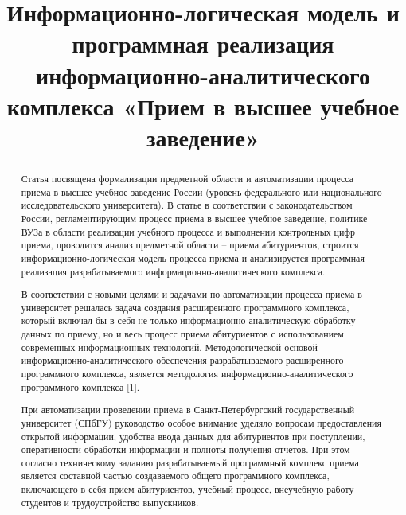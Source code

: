 \documentclass[]{article}
\title{Информационно-логическая модель и программная реализация  информационно-аналитического комплекса «Прием в высшее учебное заведение»}
\author{}
\begin{document}
\maketitle

\begin{abstract}
Статья посвящена формализации предметной области и автоматизации процесса приема в  высшее учебное заведение России (уровень федерального или национального исследовательского университета). В статье в соответствии с законодательством России, регламентирующим процесс приема в высшее учебное заведение, политике ВУЗа в области реализации учебного процесса и выполнении контрольных цифр приема, проводится анализ предметной области – приема абитуриентов, строится информационно-логическая модель процесса приема и анализируется программная реализация разрабатываемого информационно-аналитического комплекса.

В соответствии с новыми целями и задачами по автоматизации процесса приема в университет решалась задача создания расширенного программного комплекса, который включал бы в себя не только информационно-аналитическую обработку данных по приему, но и весь процесс приема абитуриентов с использованием современных информационных технологий.
Методологической основой информационно-аналитического обеспечения разрабатываемого  расширенного программного комплекса, является методология информационно-аналитического программного комплекса [1]. 

При автоматизации проведении приема в Санкт-Петербургский государственный университет (СПбГУ) руководство особое внимание уделяло вопросам предоставления открытой информации, удобства ввода данных для абитуриентов при поступлении, оперативности обработки информации и полноты получения отчетов. При этом согласно техническому заданию  разрабатываемый программный комплекс приема является составной частью создаваемого общего программного комплекса, включающего в себя прием абитуриентов, учебный процесс, внеучебную работу студентов и трудоустройство выпускников. 


\end{abstract}
\end{document}
